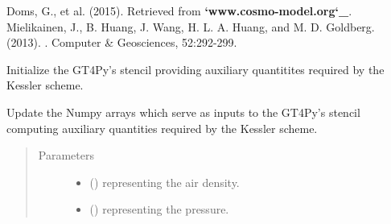 \documentclass[letterpaper,10pt,english]{sphinxmanual}
\begin{document}
\begin{fulllineitems}
\begin{fulllineitems}
Doms, G., et al. (2015).                         Retrieved from {\color{red}\bfseries{}{}`www.cosmo-model.org{}`\_}.
Mielikainen, J., B. Huang, J. Wang, H. L. A. Huang, and M. D. Goldberg. (2013). . Computer \& Geosciences, 52:292-299.

\end{fulllineitems}


\begin{fulllineitems}
\label{\detokenize{api:parameterizations.adjustment_microphysics.AdjustmentMicrophysicsKessler._stencil_auxiliary_initialize}}
Initialize the GT4Py’s stencil providing auxiliary quantitites required by the Kessler scheme.

\end{fulllineitems}


\begin{fulllineitems}
\label{\detokenize{api:parameterizations.adjustment_microphysics.AdjustmentMicrophysicsKessler._stencil_auxiliary_set_inputs}}
Update the Numpy arrays which serve as inputs to the GT4Py’s stencil computing auxiliary quantities
required by the Kessler scheme.
\begin{quote}\begin{description}
\item[{Parameters}] \leavevmode\begin{itemize}
\item {} 
 () \textendash{}  representing the air density.

\item {} 
 () \textendash{}  representing the pressure.


\end{itemize}
\end{description}
\end{quote}
\end{fulllineitems}
\end{fulllineitems}
\end{document}
